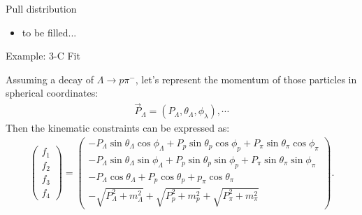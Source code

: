 \documentclass[
	xcolor=dvipsnames,
	10pt, 
	]{beamer}
\begin{document}
\begin{frame}{Pull distribution}
	\begin{itemize}
	\item{to be filled...}
\end{itemize}
\end{frame} 
\begin{frame}{Example: 3-C Fit }
	\begin{block}{}
		Assuming a decay of $\Lambda\to p\pi^-$, let's represent the momentum of those particles in spherical coordinates:
		\begin{align}
			\vec{P}_\Lambda = (P_\Lambda,\theta_\Lambda,\phi_\lambda),\cdots
		\end{align}
		Then the kinematic constraints can be expressed as:
		\begin{align}
			\begin{pmatrix}
				f_1\\f_2\\f_3\\f_4
			\end{pmatrix}=
			\begin{pmatrix}
			-P_\Lambda\sin\theta_\Lambda\cos\phi_\Lambda+P_p\sin\theta_p\cos\phi_p+P_\pi\sin\theta_\pi\cos\phi_\pi\\
			-P_\Lambda\sin\theta_\Lambda\sin\phi_\Lambda+P_p\sin\theta_p\sin\phi_p+P_\pi\sin\theta_\pi\sin\phi_\pi\\
			-P_\Lambda\cos\theta_\Lambda+P_p\cos\theta_p+p_\pi\cos\theta_\pi\\
			-\sqrt{P_\Lambda^2+m_\Lambda^2}+\sqrt{P_p^2+m_p^2}+\sqrt{P_\pi^2+m_\pi^2}
			\end{pmatrix}.\label{FMat}
		\end{align}
	\end{block}
\end{frame}
\end{document}
